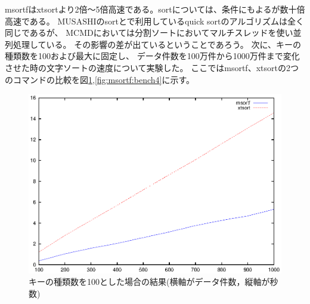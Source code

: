 msortfはxtsortより2倍〜5倍高速である。sortについては、条件にもよるが数十倍高速である。
MUSASHIのsortとで利用しているquick sortのアルゴリズムは全く同じであるが、
MCMDにおいては分割ソートにおいてマルチスレッドを使い並列処理している。
その影響の差が出ているということであろう。
次に、キーの種類数を100および最大に固定し、
データ件数を100万件から1000万件まで変化させた時の文字ソートの速度について実験した。
ここではmsortf、xtsortの2つのコマンドの比較を図\ref{fig:msortf:bench3},\ref{fig:msortf:bench4}に示す。

\begin{figure}[!hbt]
\begin{center}
\includegraphics[scale=.8]{figure/msortf/line_100.eps}
\end{center}
\caption{キーの種類数を100とした場合の結果(横軸がデータ件数，縦軸が秒数)\label{fig:msortf:bench3}}
\end{figure}

